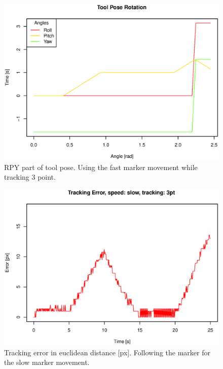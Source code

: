 \begin{figure}[H]
\centering
\includegraphics[width= \fullImageWidth]{graphics/robotics/toolPose_fast_3pt}
\caption{RPY part of tool pose. Using the fast marker movement while tracking 3 point.}
\label{fig:toolpose_fast_3p_rpy}
\end{figure}


\begin{figure}[H]
\centering
\includegraphics[width= \fullImageWidth]{graphics/robotics/trackingError_slow_3pt}
\caption{Tracking error in euclidean distance [px].
Following the marker for the slow marker movement.}
\label{fig:trackingerror_slow_3p}
\end{figure}

